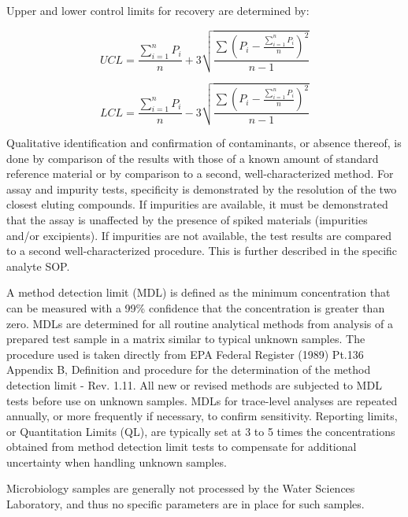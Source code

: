 \noindent
Upper and lower control limits for recovery are determined by:

\begin{equation}
UCL = \frac{\sum_{i=1}^{n} P_{i}}{n} + 3\sqrt{\frac{\sum \left (P_{i} - \frac{\sum_{i=1}^{n} P_{i}}{n} \right )^2}{n-1}}
\end{equation}

\begin{equation}
LCL = \frac{\sum_{i=1}^{n} P_{i}}{n} - 3\sqrt{\frac{\sum \left (P_{i} - \frac{\sum_{i=1}^{n} P_{i}}{n} \right )^2}{n-1}}
\end{equation}

Qualitative identification and confirmation of contaminants, or absence 
thereof, is done by comparison of the results with those of a known 
amount of standard reference material or by comparison to a second, 
well-characterized method. For assay and impurity tests, specificity is 
demonstrated by the resolution of the two closest eluting compounds. If 
impurities are available, it must be demonstrated that the assay is 
unaffected by the presence of spiked materials (impurities and/or 
excipients). If impurities are not available, the test results are 
compared to a second well-characterized procedure. This is further 
described in the specific analyte SOP. 

A method detection limit (MDL) is defined as the minimum concentration 
that can be measured with a 99\% confidence that the concentration is 
greater than zero. MDLs are determined for all routine analytical 
methods from analysis of a prepared test sample in a matrix similar to 
typical unknown samples. The procedure used is taken directly from EPA 
Federal Register (1989) Pt.136 Appendix B, Definition and procedure for 
the determination of the method detection limit - Rev. 1.11. All new or 
revised methods are subjected to MDL tests before use on unknown 
samples. MDLs for trace-level analyses are repeated annually, or more 
frequently if necessary, to confirm sensitivity. Reporting limits, or 
Quantitation Limits (QL), are typically set at 3 to 5 times the 
concentrations obtained from method detection limit tests to compensate 
for additional uncertainty when handling unknown samples. 

Microbiology samples are generally not processed by the Water Sciences 
Laboratory, and thus no specific parameters are in place for such 
samples. 



